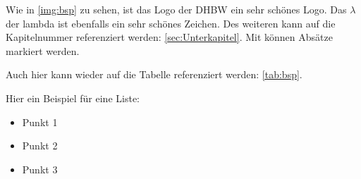 
Wie in \autoref{img:bsp} zu sehen, ist das Logo der \ac{DHBW} ein sehr schönes Logo. Das $\lambda$ der \ac{lambda} ist ebenfalls ein sehr schönes Zeichen. Des weiteren kann auf die Kapitelnummer referenziert werden: \autoref{sec:Unterkapitel}. Mit  können Absätze markiert werden.


\vspace{0.5cm}

Auch hier kann wieder auf die Tabelle referenziert werden: \ref{tab:bsp}.


\vspace{0.5cm}
Hier ein Beispiel für eine Liste:
\begin{itemize}[label=\textbullet]
    \item Punkt 1
    \item Punkt 2
    \item Punkt 3
\end{itemize}